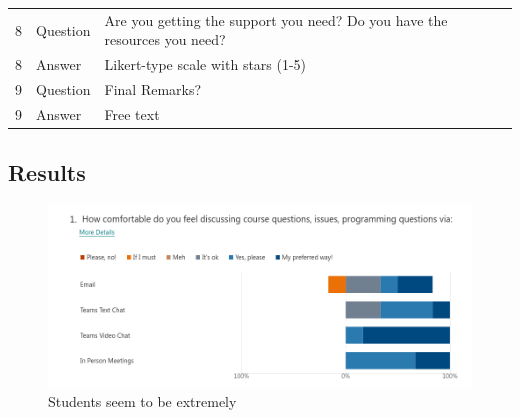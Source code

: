 \documentclass[paper=a4,justified,a4paper]{tufte-handout}
\begin{document}
\begin{longtable}[]{@{}lll@{}}
\begin{minipage}[t]{0.30\columnwidth}\raggedright
8\strut
\end{minipage} & \begin{minipage}[t]{0.30\columnwidth}\raggedright
Question\strut
\end{minipage} & \begin{minipage}[t]{0.30\columnwidth}\raggedright
Are you getting the support you need? Do you have the resources you
need?\strut
\end{minipage}\tabularnewline
\begin{minipage}[t]{0.30\columnwidth}\raggedright
8\strut
\end{minipage} & \begin{minipage}[t]{0.30\columnwidth}\raggedright
Answer\strut
\end{minipage} & \begin{minipage}[t]{0.30\columnwidth}\raggedright
Likert-type scale with stars (1-5)\strut
\end{minipage}\tabularnewline
\begin{minipage}[t]{0.30\columnwidth}\raggedright
9\strut
\end{minipage} & \begin{minipage}[t]{0.30\columnwidth}\raggedright
Question\strut
\end{minipage} & \begin{minipage}[t]{0.30\columnwidth}\raggedright
Final Remarks?\strut
\end{minipage}\tabularnewline
\begin{minipage}[t]{0.30\columnwidth}\raggedright
9\strut
\end{minipage} & \begin{minipage}[t]{0.30\columnwidth}\raggedright
Answer\strut
\end{minipage} & \begin{minipage}[t]{0.30\columnwidth}\raggedright
Free text\strut
\end{minipage}\tabularnewline
\bottomrule
\end{longtable}

\hypertarget{results}{%
\subsection{Results}\label{results}}

\begin{figure}
\centering
\includegraphics{./q1.png}
\caption{Students seem to be extremely}
\end{figure}
\end{document}
